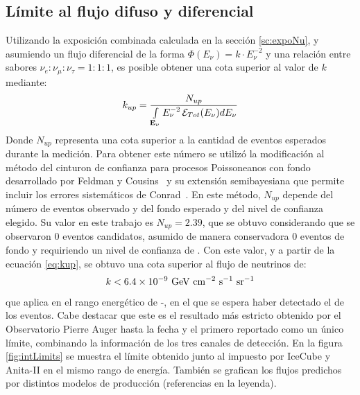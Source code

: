 	\subsection{L\'imite al flujo difuso y diferencial}
	
	Utilizando la exposici\'on combinada calculada en la secci\'on \ref{sc:expoNu}, y asumiendo un flujo diferencial de la forma $\Phi(E_\nu)= k\cdot E_\nu^{-2}$ y una relaci\'on entre sabores $\nu_e:\nu_\mu:\nu_\tau=1:1:1$, es posible obtener una cota superior al valor de $k$ mediante:
	\begin{equation}
	 k_{up}=\frac{N_{up}}{\int\limits_{\mathbf{E_{\nu}}} E_\nu^{-2}\,{\cal E}_{Tot}(E_\nu) dE_\nu}
	 \label{eq:kup}
	\end{equation}
	Donde $N_{up}$ representa una cota superior a la cantidad de eventos esperados durante la medici\'on.
	Para obtener este n\'umero se utiliz\'o la modificaci\'on al m\'etodo del cinturon de confianza para procesos Poissoneanos con fondo desarrollado por Feldman y Cousins~\cite{cite:Feldman-Cousins} y su extensi\'on semibayesiana que permite incluir los errores sistem\'aticos de Conrad~\cite{cite:Conrad_limit}.
	En este m\'etodo, $N_{up}$ depende del n\'umero de eventos observado  y del fondo esperado  y del nivel de confianza elegido.
	Su valor en este trabajo es $N_{up}=2.39$, que se obtuvo considerando que se observaron 0 eventos candidatos, asumido de manera conservadora 0 eventos de fondo y requiriendo un nivel de confianza de .
	Con este valor, y a partir de la ecuaci\'on \ref{eq:kup}, se obtuvo una cota superior al flujo de neutrinos de:
	\begin{equation}
	k < 6.4 \times 10^{-9}~{\rm GeV~cm^{-2}~s^{-1}~sr^{-1}}
	\label{eq:limitePosta}
	\end{equation}
	que aplica en el rango energ\'etico de -, en el que se espera haber detectado el  de los eventos.
	Cabe destacar que este es el resultado m\'as estricto obtenido por el Observatorio Pierre Auger hasta la fecha y el primero reportado como un \'unico l\'imite, combinando la informaci\'on de los tres canales de detecci\'on.
	En la figura \ref{fig:intLimits} se muestra el límite obtenido junto al impuesto por IceCube y Anita-II en el mismo rango de energía.
	Tambi\'en se grafican los flujos predichos por distintos modelos de producci\'on (referencias en la leyenda).
